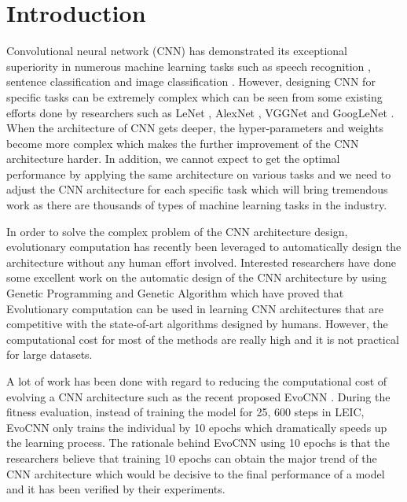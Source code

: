 \documentclass[conference]{IEEEtran}
\begin{document}
\section{Introduction}
Convolutional neural network (CNN) has demonstrated its exceptional superiority in numerous machine learning tasks such as speech recognition \cite{CNNspeech:Ossama}, sentence classification \cite{CNNsentence:Yoon} and image classification \cite{ImageNet:Alex}. However, designing CNN for specific tasks can be extremely complex which can be seen from some existing efforts done by researchers such as LeNet \cite{ZipcodeRecognition:LeCun}\cite{DocumentRecognition:LeCun}, AlexNet \cite{ImageNet:Alex}, VGGNet \cite{CNNverydeep:Simonyan} and GoogLeNet \cite{CNNdeeper:Szegedy}. When the architecture of CNN gets deeper, the hyper-parameters and weights become more complex which makes the further improvement of the CNN architecture harder. In addition, we cannot expect to get the optimal performance by applying the same architecture on various tasks and we need to adjust the CNN architecture for each specific task which will bring tremendous work as there are thousands of types of machine learning tasks in the industry. 


In order to solve the complex problem of the CNN architecture design, evolutionary computation has recently been leveraged to automatically design the architecture without any human effort involved. Interested researchers have done some excellent work on the automatic design of the CNN architecture by using Genetic Programming \cite{CNNGP:Suganuma} and Genetic Algorithm \cite{CNNevolve:Stanley} \cite{LEIC:Real} which have proved that Evolutionary computation can be used in learning CNN architectures that are competitive with the state-of-art algorithms designed by humans. However, the computational cost for most of the methods are really high and it is not practical for large datasets. 

A lot of work has been done with regard to reducing the computational cost of evolving a CNN architecture such as the recent proposed EvoCNN \cite{EvolveCNN:Yanan}. During the fitness evaluation, instead of training the model for 25, 600 steps in LEIC, EvoCNN only trains the individual by 10 epochs which dramatically speeds up the learning process. The rationale behind EvoCNN using 10 epochs is that the researchers believe that training 10 epochs can obtain the major trend of the CNN architecture which would be decisive to the final performance of a model and it has been verified by their experiments. 
\end{document}
